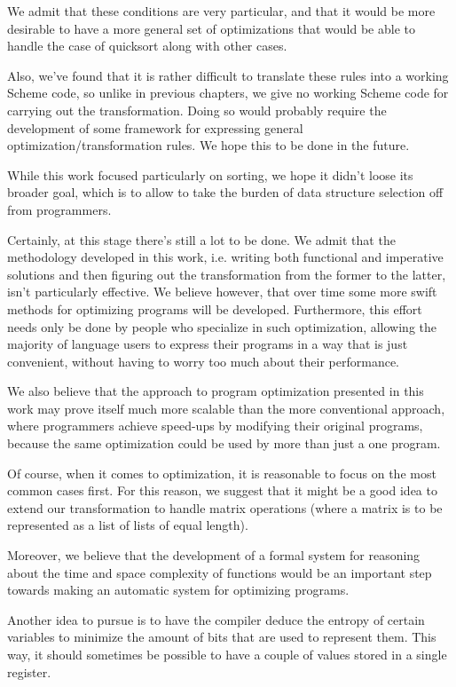 We admit that these conditions are very particular, and that it would
be more desirable to have a more general set of optimizations that would
be able to handle the case of quicksort along with other cases.

Also, we've found that it is rather difficult to translate these
rules into a working Scheme code, so unlike in previous chapters,
we give no working Scheme code for carrying out the transformation.
Doing so would probably require the development of some framework
for expressing general optimization/transformation rules. We hope
this to be done in the future.

While this work focused particularly on sorting, we hope it didn't
loose its broader goal, which is to allow to take the burden of
data structure selection off from programmers.

Certainly, at this stage there's still a lot to be done. We admit
that the methodology developed in this work, i.e. writing both
functional and imperative solutions and then figuring out
the transformation from the former to the latter, isn't particularly
effective. We believe however, that over time some more swift
methods for optimizing programs will be developed. Furthermore,
this effort needs only be done by people who specialize in such
optimization, allowing the majority of language users to express
their programs in a way that is just convenient, without having
to worry too much about their performance.

We also believe that the approach to program optimization presented
in this work may prove itself much more scalable than the more
conventional approach, where programmers achieve speed-ups by
modifying their original programs, because the same optimization
could be used by more than just a one program.

Of course, when it comes to optimization, it is reasonable to focus
on the most common cases first. For this reason, we suggest that it might be
a good idea to extend our transformation to handle matrix operations
(where a matrix is to be represented as a list of lists of equal
length).

Moreover, we believe that the development of a formal system for
reasoning about the time and space complexity of functions would
be an important step towards making an automatic system for optimizing
programs.

Another idea to pursue is to have the compiler deduce the entropy
of certain variables to minimize the amount of bits that are used
to represent them. This way, it should sometimes be possible
to have a couple of values stored in a single register.

